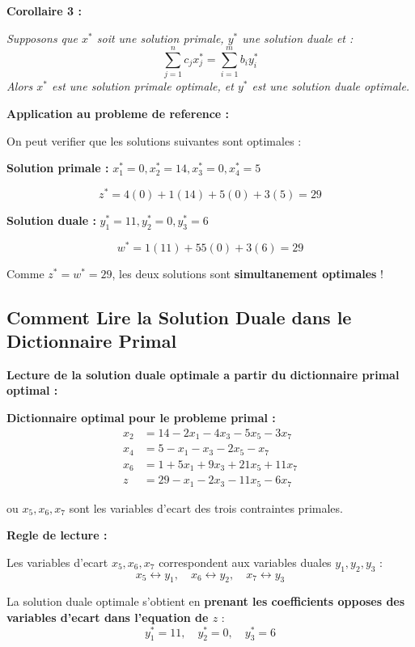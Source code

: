 \documentclass[12pt,a4paper]{article}
\begin{document}
\begin{theoreme}
\textbf{Corollaire 3 :}

\textit{Supposons que $x^*$ soit une solution primale, $y^*$ une solution duale et :}
$$\sum_{j=1}^{n} c_j x_j^* = \sum_{i=1}^{m} b_i y_i^*$$
\textit{Alors $x^*$ est une solution primale optimale, et $y^*$ est une solution duale optimale.}
\end{theoreme}

\begin{exemple}
\textbf{Application au probleme de reference :}

On peut verifier que les solutions suivantes sont optimales :

\textbf{Solution primale :} $x_1^* = 0, x_2^* = 14, x_3^* = 0, x_4^* = 5$

$$z^* = 4(0) + 1(14) + 5(0) + 3(5) = 29$$

\textbf{Solution duale :} $y_1^* = 11, y_2^* = 0, y_3^* = 6$

$$w^* = 1(11) + 55(0) + 3(6) = 29$$

Comme $z^* = w^* = 29$, les deux solutions sont \textcolor{defvert}{\textbf{simultanement optimales}} !
\end{exemple}

\subsection{Comment Lire la Solution Duale dans le Dictionnaire Primal}

\begin{methode}
\textbf{Lecture de la solution duale optimale a partir du dictionnaire primal optimal :}

\textbf{Dictionnaire optimal pour le probleme primal :}
\begin{align*}
x_2 &= 14 - 2x_1 - 4x_3 - 5x_5 - 3x_7\\
x_4 &= 5 - x_1 - x_3 - 2x_5 - x_7\\
x_6 &= 1 + 5x_1 + 9x_3 + 21x_5 + 11x_7\\
z &= 29 - x_1 - 2x_3 - 11x_5 - 6x_7
\end{align*}

ou $x_5, x_6, x_7$ sont les variables d'ecart des trois contraintes primales.

\textbf{Regle de lecture :}

Les variables d'ecart $x_5, x_6, x_7$ correspondent aux variables duales $y_1, y_2, y_3$ :
$$x_5 \leftrightarrow y_1, \quad x_6 \leftrightarrow y_2, \quad x_7 \leftrightarrow y_3$$

La solution duale optimale s'obtient en \textcolor{importantrouge}{\textbf{prenant les coefficients opposes des variables d'ecart dans l'equation de $z$}} :
$$y_1^* = 11, \quad y_2^* = 0, \quad y_3^* = 6$$
\end{methode}
\end{document}
